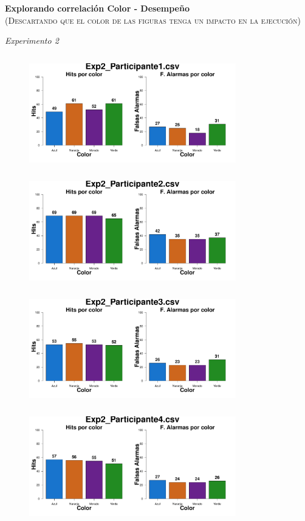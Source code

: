 \documentclass[a4paper ]{article}
\begin{document}
\begin{center}
{\LARGE \textbf{Explorando correlación Color - Desempeño}}\\
{\small \textsc{(Descartando que el color de las figuras tenga un impacto en la ejecución)}}\\
\smallskip
\end{center}
\begin{center}
{\LARGE \textit{Experimento 2}}\\
\end{center}
\vspace{3mm}
\begin{figure}[th]
\centering
\includegraphics[width=9cm, height=5cm]{Figures/Color_Exp2_P1} \includegraphics[width=9cm, height=5cm]{Figures/Color_Exp2_P2} 
\includegraphics[width=9cm, height=5cm]{Figures/Color_Exp2_P3} \includegraphics[width=9cm, height=5cm]{Figures/Color_Exp2_P4} 

\end{figure}
\end{document}
